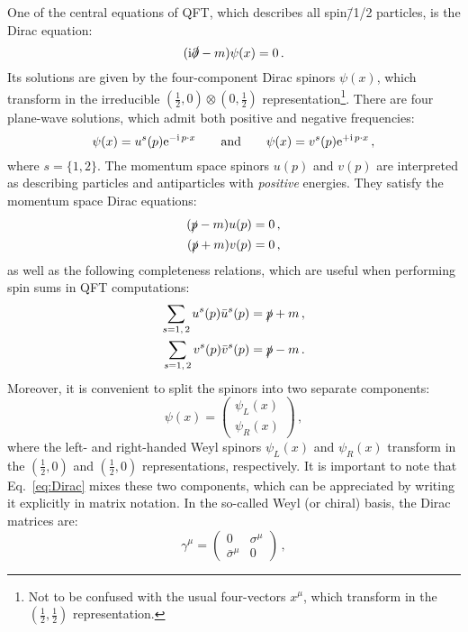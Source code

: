 \documentclass[main.tex]{subfiles}
\begin{document}
One of the central equations of QFT, which describes all spin\=/1/2 particles, is the Dirac equation:
\begin{equation} \label{eq:Dirac}
    (\mathrm{i} \slashed{\partial}-m)\psi(x) = 0\,.
\end{equation}
Its solutions are given by the four-component Dirac spinors $\psi(x)$, which transform in the irreducible $\left(\frac{1}{2}, 0\right) \otimes \left(0, \frac{1}{2}\right)$ representation\footnote{Not to be confused with the usual four-vectors $x^\mu$, which transform in the $\left(\frac{1}{2}, \frac{1}{2}\right)$ representation.}. There are four plane-wave solutions, which admit both positive and negative frequencies:
\begin{equation}
    \psi(x) = u^s(p)\mathrm{e}^{-\mathrm{i}\, p\cdot x} \qquad \text{and} \qquad \psi(x) = v^s(p)\mathrm{e}^{+\mathrm{i}\, p\cdot x}\,,
\end{equation}
where $s=\{1, 2\}$. The momentum space spinors $u(p)$ and $v(p)$ are interpreted as describing particles and antiparticles with \textit{positive} energies. They satisfy the momentum space Dirac equations: 
\begin{align}
    (\slashed{p} - m)u(p) &= 0\,, \nonumber \\
    (\slashed{p} + m)v(p) &= 0\,,
\end{align}
as well as the following completeness relations, which are useful when performing spin sums in QFT computations:
\begin{align} \label{eq:completeness:fermions}
    \sum_{s=1,\, 2} u^s(p)\bar{u}^s(p) &= \slashed{p} + m\, \nonumber, \\
    \sum_{s=1,\, 2} v^s(p)\bar{v}^s(p) &= \slashed{p} - m\,.
\end{align}
Moreover, it is convenient to split the spinors into two separate components:
\begin{equation}
    \psi(x) = 
    \begin{pmatrix}
        \psi_L(x) \\
        \psi_R(x)
    \end{pmatrix}\,,
\end{equation}
where the left- and right-handed Weyl spinors $\psi_L(x)$ and $\psi_R(x)$ transform in the $\left(\frac{1}{2}, 0 \right)$ and $\left(\frac{1}{2}, 0 \right)$ representations, respectively. It is important to note that Eq.~\ref{eq:Dirac} mixes these two components, which can be appreciated by writing it explicitly in matrix notation. In the so-called Weyl (or chiral) basis, the Dirac matrices are:
\begin{equation}
    \gamma^\mu = 
    \begin{pmatrix}
        0 & \sigma^\mu \\
        \bar{\sigma}^\mu & 0
    \end{pmatrix}\,,
\end{equation}
\end{document}
